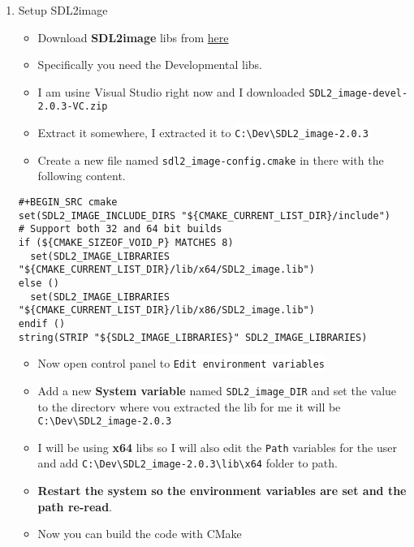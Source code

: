 \documentclass[a4paper,12pt]{article}
\let\OldTexttt\texttt
\renewcommand{\texttt}[1]{\OldTexttt{\footnotesize\colorbox{background}{\textcolor{foreground}{#1}}}}
\begin{document}
\begin{enumerate}
\item Setup SDL2image
\label{sec:org3c73054}
\begin{itemize}
\item Download \textbf{SDL2image} libs from \href{https://www.libsdl.org/projects/SDL\_image/}{here}
\item Specifically you need the Developmental libs.
\item I am using Visual Studio right now and I downloaded \texttt{SDL2\_image-devel-2.0.3-VC.zip}
\item Extract it somewhere, I extracted it to \texttt{C:\textbackslash{}Dev\textbackslash{}SDL2\_image-2.0.3}
\item Create a new file named \texttt{sdl2\_image-config.cmake} in there with the following content.
\end{itemize}

\lstset{language=cmake,label= ,caption= ,captionpos=b,numbers=none,language=cpp}
\begin{lstlisting}
#+BEGIN_SRC cmake
set(SDL2_IMAGE_INCLUDE_DIRS "${CMAKE_CURRENT_LIST_DIR}/include")
# Support both 32 and 64 bit builds
if (${CMAKE_SIZEOF_VOID_P} MATCHES 8)
  set(SDL2_IMAGE_LIBRARIES "${CMAKE_CURRENT_LIST_DIR}/lib/x64/SDL2_image.lib")
else ()
  set(SDL2_IMAGE_LIBRARIES "${CMAKE_CURRENT_LIST_DIR}/lib/x86/SDL2_image.lib")
endif ()
string(STRIP "${SDL2_IMAGE_LIBRARIES}" SDL2_IMAGE_LIBRARIES)
\end{lstlisting}

\begin{itemize}
\item Now open control panel to \texttt{Edit environment variables}
\item Add a new \textbf{System variable} named \texttt{SDL2\_image\_DIR} and set the value to the directory
where you extracted the lib for me it will be \texttt{C:\textbackslash{}Dev\textbackslash{}SDL2\_image-2.0.3}
\item I will be using \textbf{x64} libs so I will also edit the \texttt{Path} variables for
the user and add \texttt{C:\textbackslash{}Dev\textbackslash{}SDL2\_image-2.0.3\textbackslash{}lib\textbackslash{}x64} folder to path.
\end{itemize}


\begin{itemize}
\item \textbf{Restart the system so the environment variables are set and the path re-read}.
\item Now you can build the code with CMake
\end{itemize}
\end{enumerate}
\end{document}
